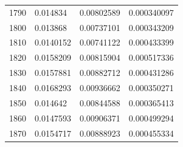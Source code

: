 \begin{center}
\begin{longtable}{l|l|l|l}
1790                                                   & 0.014834                                                          & 0.00802589                                               & 0.000340097                                                        \\
1800                                                   & 0.013868                                                          & 0.00737101                                               & 0.000343209                                                        \\
1810                                                   & 0.0140152                                                         & 0.00741122                                               & 0.000433399                                                        \\
1820                                                   & 0.0158209                                                         & 0.00815904                                               & 0.000517336                                                        \\
1830                                                   & 0.0157881                                                         & 0.00882712                                               & 0.000431286                                                        \\
1840                                                   & 0.0168293                                                         & 0.00936662                                               & 0.000350271                                                        \\
1850                                                   & 0.014642                                                          & 0.00844588                                               & 0.000365413                                                        \\
1860                                                   & 0.0147593                                                         & 0.00906371                                               & 0.000499294                                                        \\
1870                                                   & 0.0154717                                                         & 0.00888923                                               & 0.000455334                                                        \\

\end{longtable}
\end{center}
